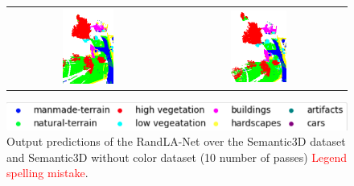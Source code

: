 \begin{figure}[h!]
\begin{tabular}{cc}
            \includegraphics[width=0.33\textwidth, height=0.18\textheight]{images/ood_imgs/de_sem3d/de_class_prob_3.png}&
            \includegraphics[width=0.33\textwidth, height=0.18\textheight]{images/sem3d_of/de_sem3d_of_3.png}\\
        \end{tabular}
        \includegraphics[scale=0.65]{images/legend.png}
        \caption{Output predictions of the RandLA-Net over the Semantic3D dataset and Semantic3D without color
         dataset  (10 number of passes) \textcolor{red}{Legend spelling mistake}.}
        \label{fig:deepensemble_vis_sem3d_OF}
    \end{figure}
    
    \FloatBarrier
    
